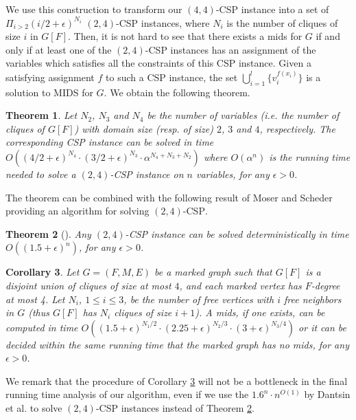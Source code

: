 \documentclass[a4paper,10pt]{article}
\theoremstyle{plain}
\newtheorem{theorem}{Theorem}
\newtheorem{corollary}[theorem]{Corollary}
\theoremstyle{definition}
\theoremstyle{remark}
\newcommand{\MIDSpb}{\textsc{MIDS}\xspace}
\newcommand{\mids}{mids\xspace}
\newcommand{\CSPpb}{\textsc{CSP}\xspace}
\begin{document}
We use this construction to transform our $(4,4)$-\CSPpb instance into a set of $\Pi_{i>2} (i/2 + \epsilon)^{N_i}$
$(2,4)$-\CSPpb instances, where $N_i$ is the number of cliques of size $i$ in $G[F]$.
Then, it is not hard to see that
there exists a \mids for $G$ if and only if at least one of the $(2,4)$-\CSPpb instances has
an assignment of the variables which satisfies all the constraints of this \CSPpb instance.
Given a satisfying assignment $f$ to such a \CSPpb instance,
the set $\bigcup_{i=1}^l \{ v_{i}^{f(x_i)} \}$
is a solution to \MIDSpb for $G$.
We obtain the following theorem.



\begin{theorem}
Let $N_2$, $N_3$ and $N_4$ be the number of variables (i.e. the number of cliques of $G[F]$)
with domain size (resp. of size) $2$, $3$ and $4$, respectively.
The corresponding \CSPpb instance can be solved in time
$O((4/2 + \epsilon)^{N_4} \cdot (3/2 + \epsilon)^{N_3} \cdot \alpha^{N_4+N_3+N_2})$
where $O(\alpha^n)$ is the running time needed to solve a $(2,4)$-\CSPpb instance on $n$ variables,
for any $\epsilon >0$.
\end{theorem}

The theorem can be combined with the following result of Moser and Scheder \cite{MoserS10}
providing an algorithm for solving $(2,4)$-\CSPpb.



\begin{theorem}[\cite{MoserS10}]\label{thm:MoserS10}
Any $(2,4)$-\CSPpb instance can be solved deterministically in time $O((1.5+\epsilon)^n)$, for any $\epsilon >0$.
\end{theorem}

\begin{corollary}\label{cor:csp}
Let $G=(F,M,E)$ be a marked graph such that
$G[F]$ is a disjoint union of cliques
of size at most $4$, and each marked vertex has $F$-degree at most 4.
Let $N_i$, $1\leq i \leq 3$, be the number of free vertices with $i$ free neighbors in $G$
(thus $G[F]$ has $N_i$ cliques of size $i+1$).
A \mids, if one exists, can be computed in time
$O( (1.5+\epsilon)^{N_1/2} \cdot (2.25 + \epsilon)^{N_2/3} \cdot (3+\epsilon)^{N_3/4})$
or it can be decided within the same running time that the marked graph has no \mids, for
any $\epsilon >0$.
\end{corollary}

We remark that the procedure of Corollary \ref{cor:csp} will not be a bottleneck in the final
running time analysis of our algorithm, even if we use the $1.6^n \cdot n^{O(1)}$ by Dantsin et al. \cite{Dantsin}
to solve $(2,4)$-\CSPpb instances instead of Theorem \ref{thm:MoserS10}.
\end{document}
